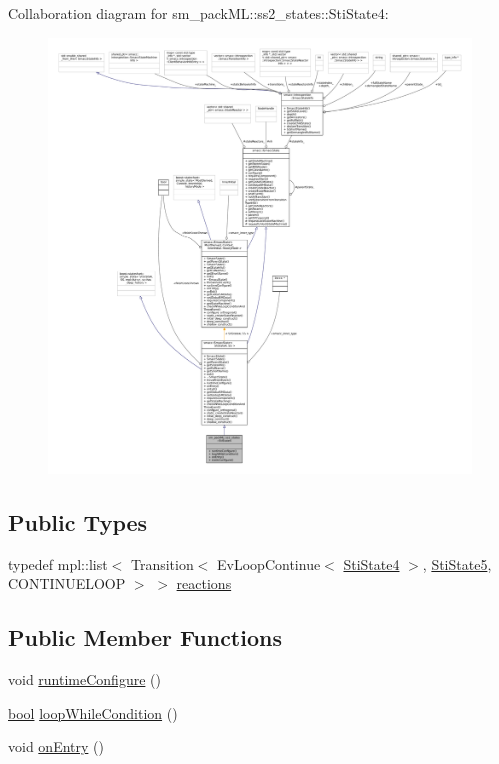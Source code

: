 Collaboration diagram for sm\+\_\+pack\+ML\+:\+:ss2\+\_\+states\+:\+:Sti\+State4\+:
\nopagebreak
\begin{figure}[H]
\begin{center}
\leavevmode
\includegraphics[width=350pt]{structsm__packML_1_1ss2__states_1_1StiState4__coll__graph}
\end{center}
\end{figure}
\subsection*{Public Types}
\begin{DoxyCompactItemize}
\item 
typedef mpl\+::list$<$ Transition$<$ Ev\+Loop\+Continue$<$ \hyperlink{structsm__packML_1_1ss2__states_1_1StiState4}{Sti\+State4} $>$, \hyperlink{structsm__packML_1_1ss2__states_1_1StiState5}{Sti\+State5}, C\+O\+N\+T\+I\+N\+U\+E\+L\+O\+OP $>$ $>$ \hyperlink{structsm__packML_1_1ss2__states_1_1StiState4_a7b817c243c22f99b64c60df51b5600db}{reactions}
\end{DoxyCompactItemize}
\subsection*{Public Member Functions}
\begin{DoxyCompactItemize}
\item 
void \hyperlink{structsm__packML_1_1ss2__states_1_1StiState4_ad9b279be944d2a55bd07be47d79e2a2e}{runtime\+Configure} ()
\item 
\hyperlink{classbool}{bool} \hyperlink{structsm__packML_1_1ss2__states_1_1StiState4_a391e3bc3488c4d52f5695d2a7c4ca5fc}{loop\+While\+Condition} ()
\item 
void \hyperlink{structsm__packML_1_1ss2__states_1_1StiState4_aea2175ea048e6df52908e876cd27c1fa}{on\+Entry} ()
\end{DoxyCompactItemize}
